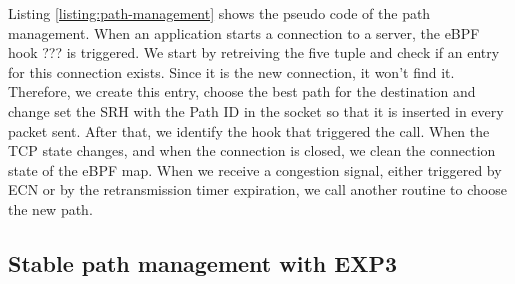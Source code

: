 


Listing \ref{listing:path-management} shows the pseudo code of the path management.
When an application starts a connection to a server, the eBPF hook ??? is triggered.
We start by retreiving the five tuple and check if an entry for this connection exists.
Since it is the new connection, it won't find it. Therefore, we create this entry,
choose the best path for the destination and change set the SRH with the Path ID
in the socket so that it is inserted in every packet sent.
After that, we identify the hook that triggered the call. When the TCP state changes, and
when the connection is closed, we clean the connection state of the eBPF map. When we receive
a congestion signal, either triggered by ECN or by the retransmission timer expiration,
we call another routine to choose the new path.

\subsection{Stable path management with EXP3}


